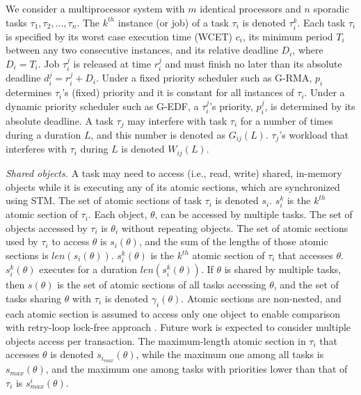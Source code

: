 \documentclass{sig-alternate}
\begin{document}
We consider a multiprocessor system with $m$ identical processors and $n$ sporadic tasks $\tau_1, \tau_2,\ldots, \tau_n$. The $k^{th}$ instance (or job) of a task $\tau_i$ is denoted $\tau_i^k$. Each task $\tau_i$ is specified by its worst case execution time (WCET) $c_i$, its minimum period $T_i$ between any two consecutive instances, and its relative deadline $D_i$, where $D_i=T_i$. Job $\tau_i^j$ is released at time $r_i^j$ and must finish no later than its absolute deadline $d_i^j=r_i^j+D_i$. Under a fixed priority scheduler such as G-RMA, $p_i$ determines $\tau_i$'s (fixed) priority and it is constant for all instances of $\tau_i$. Under a dynamic priority scheduler such as G-EDF, a $\tau_i^j$'s priority, $p_i^j$, is determined by its absolute deadline. 
A task $\tau_j$ may interfere with task $\tau_i$ for a number of times during a duration $L$, and this number is denoted as $G_{ij}(L)$. 
$\tau_j$'s workload that interferes with $\tau_i$ during $L$ is denoted $W_{ij}(L)$.


\textit{Shared objects.} A task may need to access (i.e., read, write) shared, in-memory objects while it is executing any of its atomic sections, which are synchronized using STM. 
The set of atomic sections of task $\tau_i$ is denoted $s_i$. $s_i^k$ is the $k^{th}$ atomic section of $\tau_i$. 
Each object, $\theta$, can be accessed by multiple tasks. The set of objects accessed by $\tau_i$ is $\theta_i$ without repeating objects.
The set of atomic sections used by $\tau_i$ to access $\theta$ is $s_i(\theta)$, and the sum of the lengths of those atomic sections is $len(s_i(\theta))$. $s_i^k(\theta)$ is the $k^{th}$ atomic section of $\tau_i$ that accesses $\theta$. $s_i^k(\theta)$  executes for a duration $len(s_i^k(\theta))$.
If $\theta$ is shared by multiple tasks, then $s(\theta)$ is the set of atomic sections of all tasks accessing $\theta$, and the set of tasks sharing $\theta$ with $\tau_i$ is denoted $\gamma_i(\theta)$. Atomic sections are non-nested, and each atomic section is assumed to access only one object to enable comparison with retry-loop lock-free approach \cite{key-5}. Future work is expected to consider multiple objects access per transaction. The maximum-length atomic section in $\tau_i$ that accesses $\theta$ is denoted $s_{i_{max}} (\theta)$, while the maximum one among all tasks is $s_{max} (\theta)$, and the maximum one among tasks with priorities lower than that of $\tau_i$ is $s_{max}^i (\theta)$.
\end{document}
